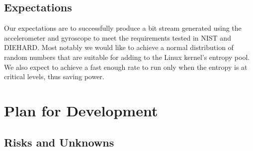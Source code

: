 \documentclass[conference]{IEEEtran}
\begin{document}
\subsection{Expectations}
Our expectations are to successfully produce a bit stream generated using the accelerometer and gyroscope to meet the requirements tested in NIST and DIEHARD.
Most notably we would like to achieve a normal distribution of random numbers that are suitable for adding to the Linux kernel's entropy pool. We also expect
to achieve a fast enough rate to run only when the entropy is at critical levels, thus saving power.

\section{Plan for Development}


\subsection{Risks and Unknowns}


%
%

\end{document}
